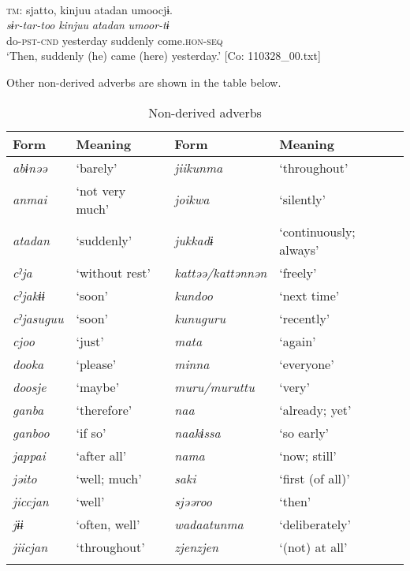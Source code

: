 \ea{} \label{ex:4.53}\\
\glll  \textsc{tm}:  sjatto,  kinjuu  atadan  umoocjɨ.\\
    \textit{sɨr-tar-too}  \textit{kinjuu}  \textit{atadan}  \textit{umoor-tɨ}\\
    do-\textsc{pst}-\textsc{cnd}  yesterday  suddenly  come.\textsc{hon}-\textsc{seq}\\
  \glt     ‘Then, suddenly (he) came (here) yesterday.’ [Co: 110328\_00.txt]
\z

Other non-derived adverbs are shown in the table below.

\begin{table}
\caption{\label{tab:27}Non-derived adverbs}
\begin{tabular}{llll}
\lsptoprule
Form & Meaning  &  Form & Meaning\\\midrule
\textit{abɨnəə} & ‘barely’  &  \textit{jiikunma} & ‘throughout’\\
\textit{anmai} & ‘not very much’  &  \textit{joikwa} & ‘silently’\\
\textit{atadan} & ‘suddenly’  &  \textit{jukkadɨ} & ‘continuously; always’\\
\textit{cˀja} & ‘without rest’  &  \textit{kattəə/kattənnən} & ‘freely’\\
\textit{cˀjakɨɨ} & ‘soon’  &  \textit{kundoo} & ‘next time’\\
\textit{cˀjasuguu} & ‘soon’  &  \textit{kunuguru} & ‘recently’\\
\textit{cjoo} & ‘just’  &  \textit{mata} & ‘again’\\
\textit{dooka} & ‘please’  &  \textit{minna} & ‘everyone’\\
\textit{doosje} & ‘maybe’  &  \textit{muru/muruttu} & ‘very’\\
\textit{ganba} & ‘therefore’  &  \textit{naa} & ‘already; yet’\\
\textit{ganboo} & ‘if so’  &  \textit{naakɨssa} & ‘so early’\\
\textit{jappai} & ‘after all’  &  \textit{nama} & ‘now; still’\\
\textit{jəito} & ‘well; much’  &  \textit{saki} & ‘first (of all)’\\
\textit{jiccjan} & ‘well’  &  \textit{sjəəroo} & ‘then’\\
\textit{jɨɨ} & ‘often, well’  &  \textit{wadaatunma} & ‘deliberately’\\
\textit{jiicjan} & ‘throughout’  &  \textit{zjenzjen} & ‘(not) at all’\\
\lspbottomrule
\end{tabular}
\end{table}

